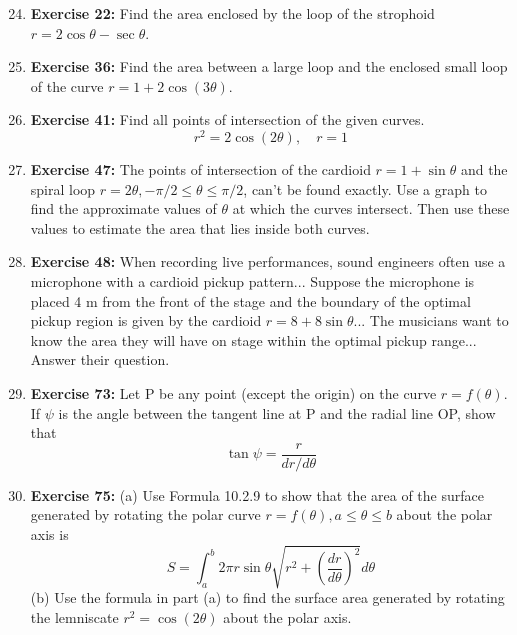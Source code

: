 \begin{enumerate}
    \setcounter{enumi}{23}
    \item \textbf{Exercise 22:} Find the area enclosed by the loop of the strophoid $r = 2\cos\theta - \sec\theta$.

    \item \textbf{Exercise 36:} Find the area between a large loop and the enclosed small loop of the curve $r = 1 + 2\cos(3\theta)$.

    \item \textbf{Exercise 41:} Find all points of intersection of the given curves.
    \[ r^2 = 2\cos(2\theta), \quad r = 1 \]

    \item \textbf{Exercise 47:} The points of intersection of the cardioid $r=1+\sin\theta$ and the spiral loop $r=2\theta, -\pi/2 \le \theta \le \pi/2$, can't be found exactly. Use a graph to find the approximate values of $\theta$ at which the curves intersect. Then use these values to estimate the area that lies inside both curves.

    \item \textbf{Exercise 48:} When recording live performances, sound engineers often use a microphone with a cardioid pickup pattern... Suppose the microphone is placed 4 m from the front of the stage and the boundary of the optimal pickup region is given by the cardioid $r = 8 + 8\sin\theta$... The musicians want to know the area they will have on stage within the optimal pickup range... Answer their question.

    \item \textbf{Exercise 73:} Let P be any point (except the origin) on the curve $r=f(\theta)$. If $\psi$ is the angle between the tangent line at P and the radial line OP, show that
    \[ \tan\psi = \frac{r}{dr/d\theta} \]

    \item \textbf{Exercise 75:} (a) Use Formula 10.2.9 to show that the area of the surface generated by rotating the polar curve $r=f(\theta), a \le \theta \le b$ about the polar axis is
    \[ S = \int_a^b 2\pi r \sin\theta \sqrt{r^2 + \left(\frac{dr}{d\theta}\right)^2} d\theta \]
    (b) Use the formula in part (a) to find the surface area generated by rotating the lemniscate $r^2 = \cos(2\theta)$ about the polar axis.
\end{enumerate}

